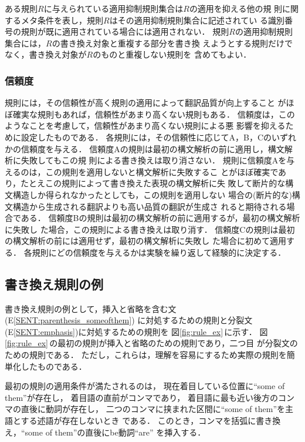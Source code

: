 ある規則$R$に与えられている適用抑制規則集合は$R$の適用を抑える他の規
則に関するメタ条件を表し，規則$R$はその適用抑制規則集合に記述されてい
る識別番号の規則が既に適用されている場合には適用されない．
規則$R$の適用抑制規則集合には，$R$の書き換え対象と重複する部分を書き換
えようとする規則だけでなく，書き換え対象が$R$のものと重複しない規則を
含めてもよい．

\subsubsection{信頼度}

規則には，その信頼性が高く規則の適用によって翻訳品質が向上すること
がほぼ確実な規則もあれば，信頼性があまり高くない規則もある．
信頼度は，このようなことを考慮して，信頼性があまり高くない規則による悪
影響を抑えるために設定したものである．
各規則には，その信頼性に応じてA，B，Cのいずれかの信頼度を与える．
信頼度Aの規則は最初の構文解析の前に適用し，構文解析に失敗してもこの規
則による書き換えは取り消さない．
規則に信頼度Aを与えるのは，この規則を適用しないと構文解析に失敗するこ
とがほぼ確実であり，たとえこの規則によって書き換えた表現の構文解析に失
敗して断片的な構文構造しか得られなかったとしても，この規則を適用しない
場合の(断片的な)構文構造から生成される翻訳よりも高い品質の翻訳が生成さ
れると期待される場合である．
信頼度Bの規則は最初の構文解析の前に適用するが，最初の構文解析に失敗し
た場合，この規則による書き換えは取り消す．
信頼度Cの規則は最初の構文解析の前には適用せず，最初の構文解析に失敗し
た場合に初めて適用する．
各規則にどの信頼度を与えるかは実験を繰り返して経験的に決定する．

\subsection{書き換え規則の例}
\label{sec:preedit:example}

書き換え規則の例として，挿入と省略を含む文(E\ref{SENT:parenthesis_someofthem})
に対処するための規則と分裂文(E\ref{SENT:emphasis})に対処するための規則を
図\ref{fig:rule_ex}\,に示す．
図\ref{fig:rule_ex}\,の最初の規則が挿入と省略のための規則であり，二つ目
が分裂文のための規則である．
ただし，これらは，理解を容易にするため実際の規則を簡単化したものである．

最初の規則の適用条件が満たされるのは，
現在着目している位置に``some of them''が存在し，
着目語の直前がコンマであり，
着目語に最も近い後方のコンマの直後に動詞が存在し，
二つのコンマに挟まれた区間に``some of them''を主語とする述語が存在しないとき
である．
このとき，コンマを括弧に書き換え，``some of them''の直後にbe動詞``are''
を挿入する．


